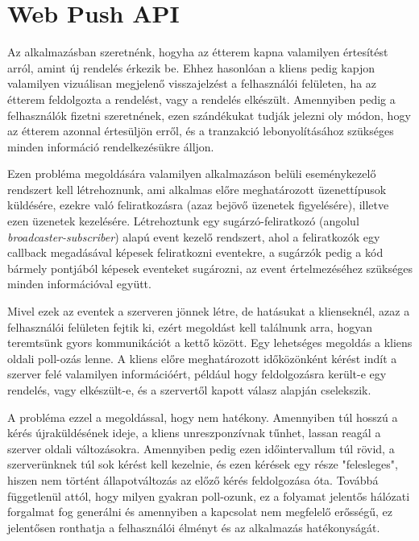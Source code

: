 \section{Web Push API}

Az alkalmazásban szeretnénk, hogyha az étterem kapna valamilyen értesítést arról, amint új rendelés érkezik be. Ehhez hasonlóan a kliens pedig kapjon valamilyen vizuálisan megjelenő visszajelzést a felhasználói felületen, ha az étterem feldolgozta a rendelést, vagy a rendelés elkészült. Amennyiben pedig a felhasználók fizetni szeretnének, ezen szándékukat tudják jelezni oly módon, hogy az étterem azonnal értesüljön erről, és a tranzakció lebonyolításához szükséges minden információ rendelkezésükre álljon. \par

Ezen probléma megoldására valamilyen alkalmazáson belüli eseménykezelő rendszert kell létrehoznunk, ami alkalmas előre meghatározott üzenettípusok küldésére, ezekre való feliratkozásra (azaz bejövő üzenetek figyelésére), illetve ezen üzenetek kezelésére. Létrehoztunk egy sugárzó-feliratkozó (angolul \emph{broadcaster-subscriber}) alapú event kezelő rendszert, ahol a feliratkozók egy callback megadásával képesek feliratkozni eventekre, a sugárzók pedig a kód bármely pontjából képesek eventeket sugározni, az event értelmezéséhez szükséges minden információval együtt. \par

Mivel ezek az eventek a szerveren jönnek létre, de hatásukat a klienseknél, azaz a felhasználói felületen fejtik ki, ezért megoldást kell találnunk arra, hogyan teremtsünk gyors kommunikációt a kettő között. Egy lehetséges megoldás a kliens oldali poll-ozás lenne. A kliens előre meghatározott időközönként kérést indít a szerver felé valamilyen információért, például hogy feldolgozásra került-e egy rendelés, vagy elkészült-e, és a szervertől kapott válasz alapján cselekszik.

A probléma ezzel a megoldással, hogy nem hatékony. Amennyiben túl hosszú a kérés újraküldésének ideje, a kliens unreszponzívnak tűnhet, lassan reagál a szerver oldali változásokra. Amennyiben pedig ezen időintervallum túl rövid, a szerverünknek túl sok kérést kell kezelnie, és ezen kérések egy része "felesleges", hiszen nem történt állapotváltozás az előző kérés feldolgozása óta. Továbbá függetlenül attól, hogy milyen gyakran poll-ozunk, ez a folyamat jelentős hálózati forgalmat fog generálni és amennyiben a kapcsolat nem megfelelő erősségű, ez jelentősen ronthatja a felhasználói élményt és az alkalmazás hatékonyságát. \par

